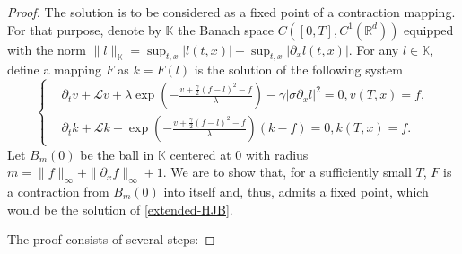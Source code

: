 \documentclass[10pt,a4paper]{amsart}
\begin{document}
\begin{proof}The solution is to be considered as a fixed point of a contraction mapping. For that purpose, 
denote by $\mathbb K$ the Banach space $C([0,T],C^1(\mathbb R^d))$ equipped with the norm $\|l\|_{\mathbb K}=\sup_{t,x}|l(t,x)|+\sup_{t,x}|\partial_x l(t,x)|$. For any $l \in \mathbb K$, define a mapping $F$ as $k=F(l)$ is the solution of the following system
\begin{equation}\label{decouple-HJB}
\left\{
\begin{split}
&\partial_t v+\mathcal Lv+\lambda\exp(-\frac{v+\frac{\gamma}{2}(f-l)^2-f}{\lambda})-\gamma |\sigma \partial_x l|^2=0, v(T,x)=f,\\
& \partial_tk+\mathcal L k-\exp(-\frac{v+\frac{\gamma}{2}(f-l)^2-f}{\lambda})(k-f)=0,k(T,x)=f.
\end{split}
\right.
\end{equation}
Let $B_m(0)$ be the ball in $\mathbb K$ centered at $0$ with radius $m=\|f\|_{\infty}+\|\partial_x f\|_{\infty}+1$. We are to show that, for a sufficiently small $T$, $F$ is a contraction from $B_m(0)$ into itself and, thus, admits a fixed point, which would  be the solution of \eqref{extended-HJB}. 

The proof consists of several steps:


\end{proof}
\end{document}
